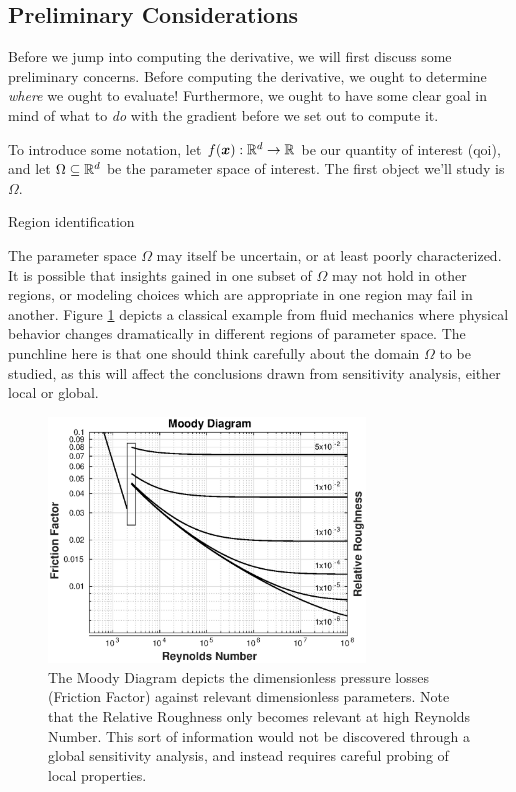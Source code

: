 \documentclass[../primer.tex]{subfiles}
\begin{document}
\subsection{Preliminary Considerations}
\label{sec:org797e9af}
Before we jump into computing the derivative, we will first discuss some
preliminary concerns. Before computing the derivative, we ought to determine
\emph{where} we ought to evaluate! Furthermore, we ought to have some clear goal in
mind of what to \emph{do} with the gradient before we set out to compute it.

To introduce some notation, let \(f(\boldsymbol{x}):\mathbb{R}^{d}\to\mathbb{R}^{}\) be our quantity of
interest (qoi), and let \(\Omega\subseteq\mathbb{R}^{d}\) be the parameter space of
interest. The first object we'll study is \(\Omega\).

Region identification

The parameter space \(\Omega\) may itself be uncertain, or at least poorly
characterized. It is possible that insights gained in one subset of \(\Omega\) may
not hold in other regions, or modeling choices which are appropriate in one
region may fail in another. Figure \ref{fig:moody} depicts a classical example
from fluid mechanics where physical behavior changes dramatically in different
regions of parameter space. The punchline here is that one should think
carefully about the domain \(\Omega\) to be studied, as this will affect the
conclusions drawn from sensitivity analysis, either local or global.

\begin{figure}[!ht]
  \centering\includegraphics[width=0.75\textwidth]{./images/moody_diagram}
  \caption{The Moody Diagram depicts the dimensionless pressure losses (Friction Factor)
  against relevant dimensionless parameters. Note that the Relative Roughness only
  becomes relevant at high Reynolds Number. This sort of information would not be
  discovered through a global sensitivity analysis, and instead requires careful
  probing of local properties.}
  \label{fig:moody}
\end{figure}
\end{document}

